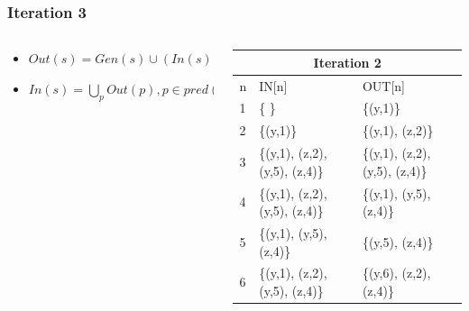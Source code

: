 \begin{frame}[fragile, t]
	\frametitle{Iteration 3} 
	
	\vspace{-1cm}
	
	\begin{columns}[T]
		\begin{column}[T]{.4\textwidth}
			\begin{center}
				\begin{tiny}
					\begin{minipage}{8cm}
							\begin{itemize}
								\item $Out(s) = Gen(s) \cup (In(s) - Kill(s))$  
								\item $In(s) = \bigcup_p Out(p), p \in pred(s), s \in stmts$
							\end{itemize}
					\end{minipage}
				\end{tiny}
			\end{center}
		\end{column}
		\begin{column}[T]{.6\textwidth}
			\begin{tiny}
				\begin{table}[]
					\begin{tabular}{|l|l|l|}
						\hline			
						\multicolumn{3}{|c|}{Iteration 2}\\
						\hline
						n  & IN{[}n{]} & OUT{[}n{]} \\ \hline
						1  & \{ \}                          & \{(y,1)\} \\ \hline
						2  & \{(y,1)\}                      & \{(y,1), (z,2)\} \\ \hline
						3  & \{(y,1), (z,2), (y,5), (z,4)\} & \{(y,1), (z,2), (y,5), (z,4)\} \\ \hline
						4  & \{(y,1), (z,2), (y,5), (z,4)\} & \{(y,1), (y,5), (z,4)\} \\ \hline
						5  & \{(y,1), (y,5), (z,4)\}        & \{(y,5), (z,4)\} \\ \hline
						6  & \{(y,1), (z,2), (y,5), (z,4)\} & \{(y,6), (z,2), (z,4)\} \\ \hline
					\end{tabular}
				\end{table}   
			\end{tiny}
		\end{column}
	\end{columns}
	

\end{frame}
